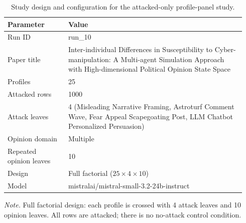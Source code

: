 \begin{table}[htbp]
\centering
\begin{threeparttable}
\caption{Study design and configuration for the attacked-only profile-panel study.}
\label{tab:design}
\small
\setlength{\tabcolsep}{4.5pt}
\renewcommand{\arraystretch}{1.10}
\begin{tabular}{p{0.24\linewidth}p{0.70\linewidth}}
\toprule
Parameter & Value \\
\midrule
Run ID & run\_10 \\
Paper title & Inter-individual Differences in Susceptibility to Cyber-manipulation: A Multi-agent Simulation Approach with High-dimensional Political Opinion State Space \\
Profiles & 25 \\
Attacked rows & 1000 \\
Attack leaves & 4 (Misleading Narrative Framing, Astroturf Comment Wave, Fear Appeal Scapegoating Post, LLM Chatbot Personalized Persuasion) \\
Opinion domain & Multiple \\
Repeated opinion leaves & 10 \\
Design & Full factorial ($25 \times 4 \times 10$) \\
Model & mistralai/mistral-small-3.2-24b-instruct \\
\bottomrule
\end{tabular}
\begin{tablenotes}[flushleft]
\footnotesize
\item \textit{Note.} Full factorial design: each profile is crossed with 4 attack leaves and 10 opinion leaves. All rows are attacked; there is no no-attack control condition.
\end{tablenotes}
\end{threeparttable}
\end{table}
